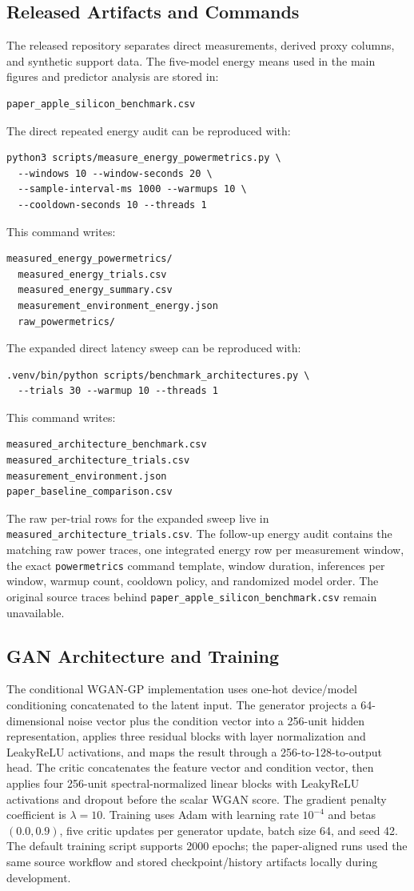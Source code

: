 \documentclass[conference]{IEEEtran}
\begin{document}
\subsection{Released Artifacts and Commands}
The released repository separates direct measurements, derived proxy columns,
and synthetic support data. The five-model energy means used in the main
figures and predictor analysis are stored in:
\begin{verbatim}
paper_apple_silicon_benchmark.csv
\end{verbatim}
The direct repeated energy audit can be reproduced with:
\begin{verbatim}
python3 scripts/measure_energy_powermetrics.py \
  --windows 10 --window-seconds 20 \
  --sample-interval-ms 1000 --warmups 10 \
  --cooldown-seconds 10 --threads 1
\end{verbatim}
This command writes:
\begin{verbatim}
measured_energy_powermetrics/
  measured_energy_trials.csv
  measured_energy_summary.csv
  measurement_environment_energy.json
  raw_powermetrics/
\end{verbatim}
The expanded direct latency sweep can be reproduced with:
\begin{verbatim}
.venv/bin/python scripts/benchmark_architectures.py \
  --trials 30 --warmup 10 --threads 1
\end{verbatim}
This command writes:
\begin{verbatim}
measured_architecture_benchmark.csv
measured_architecture_trials.csv
measurement_environment.json
paper_baseline_comparison.csv
\end{verbatim}
The raw per-trial rows for the expanded sweep live in
\texttt{measured\_architecture\_trials.csv}. The follow-up energy audit
contains the matching raw power traces, one integrated energy row per
measurement window, the exact \texttt{powermetrics} command template, window
duration, inferences per window, warmup count, cooldown policy, and randomized
model order. The original source traces behind
\texttt{paper\_apple\_silicon\_benchmark.csv} remain unavailable.

\subsection{GAN Architecture and Training}
The conditional WGAN-GP implementation uses one-hot device/model conditioning
concatenated to the latent input. The generator projects a 64-dimensional noise
vector plus the condition vector into a 256-unit hidden representation, applies
three residual blocks with layer normalization and LeakyReLU activations, and
maps the result through a 256-to-128-to-output head. The critic concatenates
the feature vector and condition vector, then applies four 256-unit
spectral-normalized linear blocks with LeakyReLU activations and dropout before
the scalar WGAN score. The gradient penalty coefficient is $\lambda = 10$.
Training uses Adam with learning rate $10^{-4}$ and betas $(0.0, 0.9)$, five
critic updates per generator update, batch size 64, and seed 42. The default
training script supports 2000 epochs; the paper-aligned runs used the same
source workflow and stored checkpoint/history artifacts locally during
development.
\end{document}
